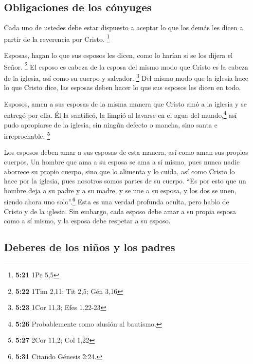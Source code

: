 \hypertarget{obligaciones-de-los-cuxf3nyuges}{%
\subsection{Obligaciones de los
cónyuges}\label{obligaciones-de-los-cuxf3nyuges}}

 Cada uno de ustedes debe estar dispuesto a aceptar lo
que los demás les dicen a partir de la reverencia por Cristo.
\footnote{\textbf{5:21} 1Pe 5,5}

 Esposas, hagan lo que sus esposos les dicen, como lo
harían si se los dijera el Señor. \footnote{\textbf{5:22} 1Tim 2,11; Tit
  2,5; Gén 3,16}  El esposo es cabeza de la esposa del
mismo modo que Cristo es la cabeza de la iglesia, así como su cuerpo y
salvador. \footnote{\textbf{5:23} 1Cor 11,3; Efes 1,22-23}
 Del mismo modo que la iglesia hace lo que Cristo dice,
las esposas deben hacer lo que sus esposos les dicen en todo.

 Esposos, amen a sus esposas de la misma manera que
Cristo amó a la iglesia y se entregó por ella.  Él la
santificó, la limpió al lavarse en el agua del mundo,\footnote{\textbf{5:26}
  Probablemente como alusión al bautismo.}  así pudo
apropiarse de la iglesia, sin ningún defecto o mancha, sino santa e
irreprochable. \footnote{\textbf{5:27} 2Cor 11,2; Col 1,22}

 Los esposos deben amar a sus esposas de esta manera, así
como aman sus propios cuerpos. Un hombre que ama a su esposa se ama a sí
mismo,  pues nunca nadie aborrece su propio cuerpo, sino
que lo alimenta y lo cuida, así como Cristo lo hace por la iglesia,
 pues nosotros somos partes de su cuerpo. 
``Es por esto que un hombre deja a su padre y a su madre, y se une a su
esposa, y los dos se unen, siendo ahora uno solo''.\footnote{\textbf{5:31}
  Citando Génesis 2:24.}  Esta es una verdad profunda
oculta, pero hablo de Cristo y de la iglesia.  Sin
embargo, cada esposo debe amar a su propia esposa como a sí mismo, y la
esposa debe respetar a su esposo.

\hypertarget{deberes-de-los-niuxf1os-y-los-padres}{%
\subsection{Deberes de los niños y los
padres}\label{deberes-de-los-niuxf1os-y-los-padres}}

